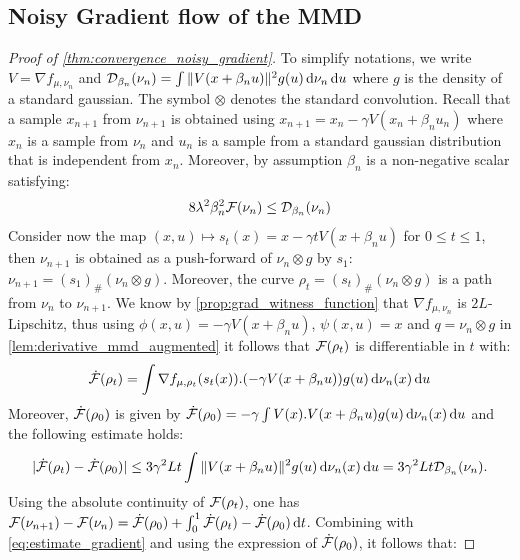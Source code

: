 \subsection{Noisy Gradient flow of the MMD}
\begin{proof}[Proof of \cref{thm:convergence_noisy_gradient}]\label{proof:thm:convergence_noisy_gradient}
To simplify notations, we write $V = \nabla f_{\mu,\nu_n}$ and $\mathcal{D}_{\beta_n}(\nu_n)  = \int \Vert V(x+\beta_n u) \Vert^2 g(u)\mathop{}\!\mathrm{d} \nu_n \mathop{}\!\mathrm{d} u $ where $g$ is the density of a standard gaussian. The symbol $\otimes$ denotes the standard convolution. Recall that a sample $x_{n+1}$ from $\nu_{n+1}$ is obtained using  $x_{n+1} = x_n - \gamma V(x_n+ \beta_n u_n)$
	where $x_n$ is a sample from $\nu_n$ and $u_n$ is a sample from a standard gaussian distribution that is independent from $x_n$. Moreover, by assumption $\beta_n$ is a non-negative scalar satisfying:
	\begin{align}\label{eq:control_noise_level_bis}
		8\lambda^2\beta_n^2 {{\mathcal F}}(\nu_n) \leq \mathcal{D}_{\beta_n}(\nu_n)  
	\end{align}
	 Consider now the map $(x,u)\mapsto s_t(x)= x - \gamma tV(x+\beta_n u)$ for $0\leq t\leq 1$, then $\nu_{n+1}$ is obtained as a push-forward of $\nu_n\otimes g$ by $s_1$: $\nu_{n+1} = (s_1)_{\#}(\nu_n\otimes g)$. Moreover, the curve $\rho_t = (s_t)_{\#}(\nu_n\otimes g)$ is a path from $\nu_n$ to $\nu_{n+1}$. We know by \cref{prop:grad_witness_function} that $\nabla f_{\mu,\nu_n}$ is $2L$-Lipschitz, thus using $\phi(x,u) = -\gamma V(x+\beta_n u)$, $\psi(x,u) = x$ and $q = \nu_n\otimes g $ in \cref{lem:derivative_mmd_augmented} it follows that ${{\mathcal F}}(\rho_t)$ is differentiable in $t$ with:
	 \begin{equation*}
	 \dot{{{\mathcal F}}}(\rho_t)=\int \nabla f_{\mu,\rho_t}(s_t(x)).(-\gamma V(x+\beta_n u))g(u)\mathop{}\!\mathrm{d} \nu_n(x)\mathop{}\!\mathrm{d} u
	 \end{equation*} 
	 Moreover, $\dot{{{\mathcal F}}}(\rho_0)$ is given by $\dot{{{\mathcal F}}}(\rho_0)= -\gamma \int V(x).V(x+\beta_n u) g(u)\mathop{}\!\mathrm{d}\nu_n(x)\mathop{}\!\mathrm{d} u$ and the following estimate holds:
	 \begin{align}\label{eq:estimate_gradient}
	 	\vert \dot{{{\mathcal F}}} (\rho_t) -\dot{{{\mathcal F}}}(\rho_0)\vert \leq 3\gamma^2 L t \int \Vert V(x+\beta_n u) \Vert^2 g(u)\mathop{}\!\mathrm{d}\nu_n(x)\mathop{}\!\mathrm{d} u = 3\gamma^2 Lt \mathcal{D}_{\beta_n}(\nu_n).
	 \end{align}
	Using the absolute continuity of ${{\mathcal F}}(\rho_t)$, one has $\mathcal{F}(\nu_{n+1})-\mathcal{F}(\nu_{n})
	=\dot{{{\mathcal F}}}(\rho_0)+ \int_0^1 \dot{{{\mathcal F}}} (\rho_t) -  \dot{{{\mathcal F}}} (\rho_0) \mathop{}\!\mathrm{d} t $. Combining with  \cref{eq:estimate_gradient} and using the expression of $\dot{{{\mathcal F}}}(\rho_0)$, it follows that:

\end{proof}
